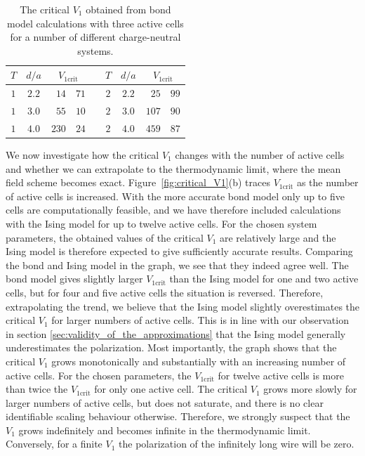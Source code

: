 \begin{table}
  \center
  \begin{tabular}{c c r @{.} l p{0cm} c c r @{.} l}
    $T$ & $d/a$ & \multicolumn{2}{c}{$V_{1\textrm{crit}}$} & &
    $T$ & $d/a$ & \multicolumn{2}{c}{$V_{1\textrm{crit}}$} \\
    \hline 
    $1$ & $2.2$ & $ 14$&$71$ & &
    $2$ & $2.2$ & $ 25$&$99$ \\
    $1$ & $3.0$ & $ 55$&$10$ & &
    $2$ & $3.0$ & $107$&$90$ \\
    $1$ & $4.0$ & $230$&$24$ & &
    $2$ & $4.0$ & $459$&$87$ \\
  \end{tabular}
  \caption[Critical $V_1$ for different systems]
  {
  \label{tab:critical_V1}
  The critical $V_1$ obtained from bond model calculations with three active
  cells for a number of different charge-neutral systems.
  }
\end{table}

We now investigate how the critical $V_1$ changes with the number of active
cells and whether we can extrapolate to the thermodynamic limit, where the mean
field scheme becomes exact. Figure~\ref{fig:critical_V1}(b) traces
$V_{1\textrm{crit}}$ as the number of active cells is increased. With the more
accurate bond model only up to five cells are computationally feasible, and we
have therefore included calculations with the Ising model for up to twelve
active cells. For the chosen system parameters, the obtained values of the
critical $V_1$ are relatively large and the Ising model is therefore expected to
give sufficiently accurate results. Comparing the bond and Ising model in the
graph, we see that they indeed agree well. The bond model gives slightly larger
$V_{1\textrm{crit}}$ than the Ising model for one and two active cells, but for
four and five active cells the situation is reversed. Therefore, extrapolating
the trend, we believe that the Ising model slightly overestimates the critical
$V_1$ for larger numbers of active cells. This is in line with our observation
in section \ref{sec:validity_of_the_approximations} that the Ising model
generally underestimates the polarization. Most importantly, the graph shows
that the critical $V_1$ grows monotonically and substantially with an increasing
number of active cells. For the chosen parameters, the $V_{1\textrm{crit}}$ for
twelve active cells is more than twice the $V_{1\textrm{crit}}$ for only one
active cell. The critical $V_1$ grows more slowly for larger numbers of active
cells, but does not saturate, and there is no clear identifiable scaling
behaviour otherwise. Therefore, we strongly suspect that the $V_1$ grows
indefinitely and becomes infinite in the thermodynamic limit. Conversely, for a
finite $V_1$ the polarization of the infinitely long wire will be zero.

